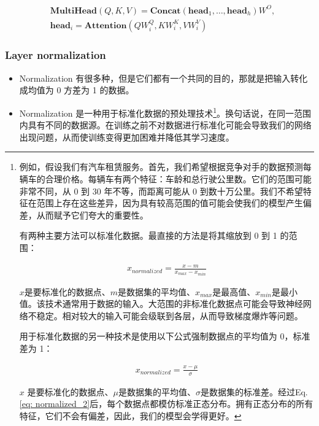 \documentclass[letterpaper,10pt]{article}
\begin{document}
	\begin{equation}
		\begin{aligned}
			& \textbf{MultiHead}(Q,K,V)=\textbf{Concat}(\textbf{head}_{1},\ldots,\textbf{head}_{h})W^{O}, \\
			& \textbf{head}_{i} = \textbf{Attention}(QW_i^Q,KW_i^K,VW_i^V)
		\end{aligned}
		\label{eq: Multi-head attention}
	\end{equation}
	
	\subsubsection{Layer normalization}
	
	\begin{itemize}
		\item {} Normalization 有很多种，但是它们都有一个共同的目的，那就是把输入转化成均值为 0 方差为 1 的数据。
		
		\item {} Normalization 是一种用于标准化数据的预处理技术\footnote{例如，假设我们有汽车租赁服务。首先，我们希望根据竞争对手的数据预测每辆车的合理价格。每辆车有两个特征：车龄和总行驶公里数。它们的范围可能非常不同，从 0 到 30 年不等，而距离可能从 0 到数十万公里。我们不希望特征在范围上存在这些差异，因为具有较高范围的值可能会使我们的模型产生偏差，从而赋予它们夸大的重要性。
		
		有两种主要方法可以标准化数据。最直接的方法是将其缩放到 0 到 1 的范围：
		
		\begin{equation}
			\begin{aligned}
				x_{normalized} = \frac{x-m}{x_{max}-x_{min}}
			\end{aligned}
			\label{eq: normalized_1}
		\end{equation}
		
		$x$是要标准化的数据点、$m$是数据集的平均值、$x_{max}$是最高值、$x_{min}$是最小值。该技术通常用于数据的输入。大范围的非标准化数据点可能会导致神经网络不稳定。相对较大的输入可能会级联到各层，从而导致梯度爆炸等问题。
		
		用于标准化数据的另一种技术是使用以下公式强制数据点的平均值为 0，标准差为 1：
		
		\begin{equation}
			\begin{aligned}
				x_{normalized} = \frac{x-\mu}{\sigma}
			\end{aligned}
			\label{eq: normalized_2}
		\end{equation}
		
		$x$ 是要标准化的数据点、$\mu$是数据集的平均值、$\sigma$是数据集的标准差。经过Eq.\ref{eq: normalized_2}后，每个数据点都模仿标准正态分布。拥有正态分布的所有特征，它们不会有偏差，因此，我们的模型会学得更好。
		}。换句话说，在同一范围内具有不同的数据源。在训练之前不对数据进行标准化可能会导致我们的网络出现问题，从而使训练变得更加困难并降低其学习速度。
	\end{itemize}
	
\end{document}
